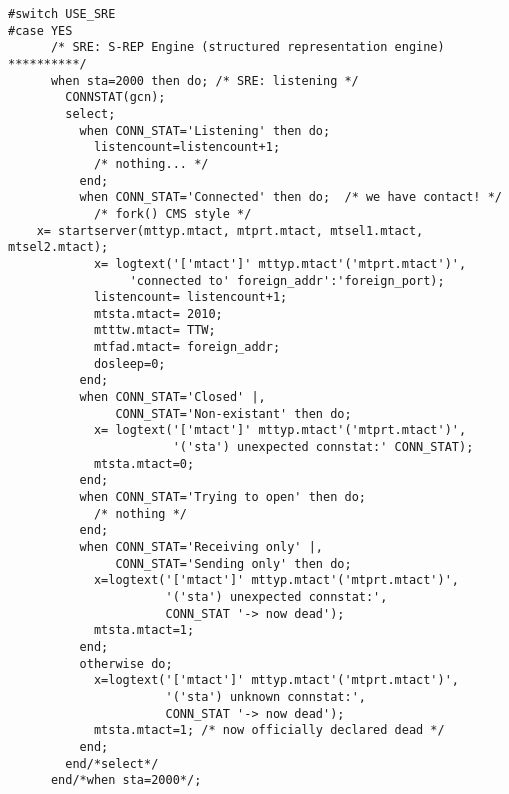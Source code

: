 \begin{verbatim}
#switch USE_SRE
#case YES 
      /* SRE: S-REP Engine (structured representation engine) **********/
      when sta=2000 then do; /* SRE: listening */
        CONNSTAT(gcn);
        select;
          when CONN_STAT='Listening' then do;
            listencount=listencount+1;
            /* nothing... */
          end;
          when CONN_STAT='Connected' then do;  /* we have contact! */
            /* fork() CMS style */
    x= startserver(mttyp.mtact, mtprt.mtact, mtsel1.mtact, mtsel2.mtact);
            x= logtext('['mtact']' mttyp.mtact'('mtprt.mtact')',
                 'connected to' foreign_addr':'foreign_port);
            listencount= listencount+1;
            mtsta.mtact= 2010;
            mtttw.mtact= TTW;
            mtfad.mtact= foreign_addr;
            dosleep=0;
          end;
          when CONN_STAT='Closed' |,
               CONN_STAT='Non-existant' then do;
            x= logtext('['mtact']' mttyp.mtact'('mtprt.mtact')',
                       '('sta') unexpected connstat:' CONN_STAT);
            mtsta.mtact=0;
          end;
          when CONN_STAT='Trying to open' then do;
            /* nothing */
          end;
          when CONN_STAT='Receiving only' |,
               CONN_STAT='Sending only' then do;
            x=logtext('['mtact']' mttyp.mtact'('mtprt.mtact')',
                      '('sta') unexpected connstat:',
                      CONN_STAT '-> now dead');
            mtsta.mtact=1;
          end;
          otherwise do;
            x=logtext('['mtact']' mttyp.mtact'('mtprt.mtact')',
                      '('sta') unknown connstat:',
                      CONN_STAT '-> now dead');
            mtsta.mtact=1; /* now officially declared dead */
          end;
        end/*select*/
      end/*when sta=2000*/;


\end{verbatim}
